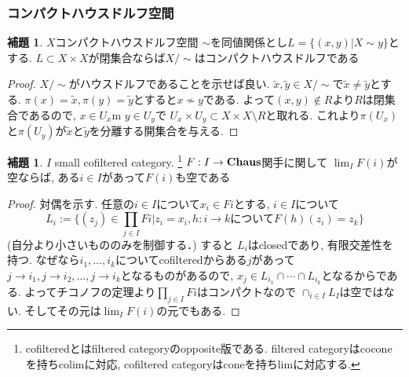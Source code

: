 \documentclass[dvipdfmx,a4paper,11pt]{article}
\theoremstyle{definition}
\newtheorem{lem}[thm]{補題}
\begin{document}
\subsubsection{コンパクトハウスドルフ空間}

 \begin{tcolorbox}
 [colback = white, colframe = green!35!black, fonttitle = \bfseries,breakable = true]
\begin{lem}
\label{lem-CHaus-relation}
$X$コンパクトハウスドルフ空間
$\sim$を同値関係とし$L = \{ (x,y) | X \sim y\}$とする.
$L \subset X \times X$が閉集合ならば$X/\sim$はコンパクトハウスドルフである
\end{lem}
\end{tcolorbox}

\begin{proof}
$X / \sim$がハウスドルフであることを示せば良い.
$\tilde{x}, \tilde{y} \in X/ \sim$で$\tilde{x} \neq \tilde{y}$とする.
$\pi(x) = \tilde{x}, \pi(y) = \tilde{y}$とすると$x \not \sim y$である.
よって$(x,y) \not \in R$より$R$は閉集合であるので, $x \in U_x$m $y \in U_y$で
$U_x \times U_y \subset X \times X \setminus R$と取れる.
これより$\pi(U_x)$と$\pi(U_y)$が$\tilde{x}$と$\tilde{y}$を分離する開集合を与える. 
\end{proof}


   \begin{tcolorbox}
 [colback = white, colframe = green!35!black, fonttitle = \bfseries,breakable = true]
\begin{lem}
\label{lem-cpthaus}
$I$ small cofiltered category. \footnote{cofilteredとはfiltered categoryのopposite版である. filtered categoryはcoconeを持ちcolimに対応, cofiltered categoryはconeを持ちlimに対応する.}
$F :  I \to {\bf Chaus}$関手に関して
$\lim_{I}F(i)$が空ならば, ある$i \in I$があって$F(i)$も空である
\end{lem}
\end{tcolorbox}
\begin{proof}
対偶を示す. 
任意の$i \in I$について$x_i \in Fi$とする, 
$i \in I$について
$$
L_i := \{(z_j) \in \prod_{j \in I}{Fi} | z_i =x_i, \text{$h : i \to k$について$F(h)(z_i) = z_k$}\}
$$
(自分より小さいもののみを制御する．)
すると
$L_i$はclosedであり, 有限交差性を持つ.
なぜなら$i_1, \ldots, i_k$についてcofilteredからある$j$があって
$j \to i_1, j\to i_2, \ldots , j\to i_k$となるものがあるので, $x_j \in L_{i_1}\cap \cdots \cap L_{i_k}$となるからである. 
よってチコノフの定理より$\prod_{j \in I}{Fi} $はコンパクトなので
$\cap_{i \in I} L_I$は空ではない.
そしてその元は$\lim_{I}F(i)$の元でもある.
\end{proof}
\end{document}
